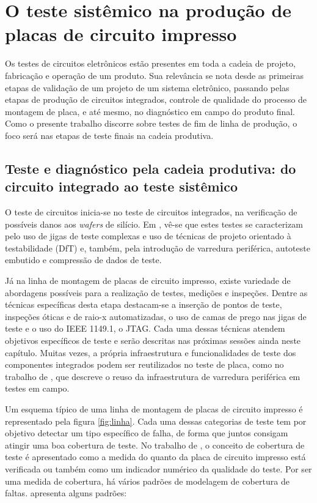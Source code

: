 \chapter{O teste sistêmico na produção de placas de circuito impresso}
\label{rev}


Os testes de circuitos eletrônicos estão presentes em toda a cadeia de projeto, fabricação e operação de um produto. Sua relevância se nota desde as primeiras etapas de validação de um projeto de um sistema eletrônico, passando pelas etapas de produção de circuitos integrados, controle de qualidade do processo de montagem de placa, e até mesmo, no diagnóstico em campo do produto final. Como o presente trabalho discorre sobre testes de fim de linha de produção, o foco será nas etapas de teste finais na cadeia produtiva.

\section{Teste e diagnóstico pela cadeia produtiva: do circuito integrado ao teste sistêmico}

O teste de circuitos inicia-se no teste de circuitos integrados, na verificação de possíveis danos aos \textit{wafers} de silício. Em \citet{mitra2010post}, vê-se que estes testes se caracterizam pelo uso de jigas de teste complexas e uso de técnicas de projeto orientado à testabilidade (DfT) e, também, pela introdução de varredura periférica, autoteste embutido e compressão de dados de teste. 

Já na linha de montagem de placas de circuito impresso, existe variedade de abordagens possíveis para a realização de testes, medições e inspeções. Dentre as técnicas específicas desta etapa destacam-se a inserção de pontos de teste, inspeções óticas e de raio-x automatizadas, o uso de camas de prego nas jigas de teste e o uso do IEEE 1149.1, o JTAG. Cada uma dessas técnicas atendem objetivos específicos de teste e serão descritas nas próximas sessões ainda neste capítulo. Muitas vezes, a própria infraestrutura e funcionalidades de teste dos componentes integrados podem ser reutilizados no teste de placa, como no trabalho de \citet{cook2012reuse}, que descreve o reuso da infraestrutura de varredura periférica em testes em campo. 


Um esquema típico de uma linha de montagem de placas de circuito impresso é representado pela figura \ref{fig:linha}. Cada uma dessas categorias de teste tem por objetivo detectar um tipo específico de falha, de forma que juntos consigam atingir uma boa cobertura de teste. No trabalho de \citet{hird2002test}, o conceito de cobertura de teste é apresentado como a medida do quanto da placa de circuito impresso está verificada ou também como  um indicador numérico da qualidade do teste. Por ser uma medida de cobertura, há vários padrões de modelagem de cobertura de faltas. \citet{lotz2006functional} apresenta alguns padrões:

